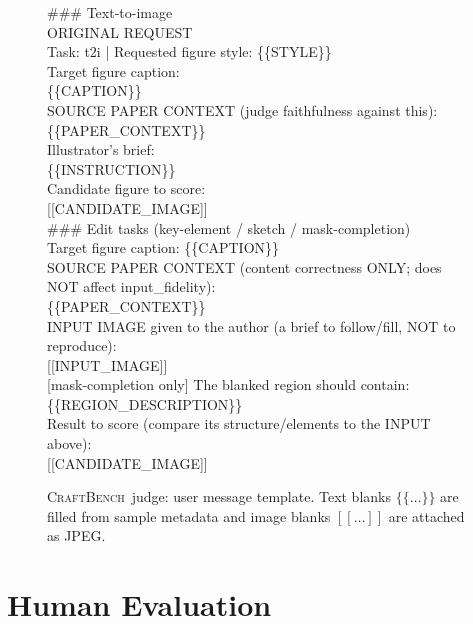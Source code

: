 \documentclass{article}
\newcommand{\CrafterBench}{\textsc{CraftBench}\xspace}
\begin{document}
\begin{figure}[t]
\centering
\begin{tcolorbox}[title={User message (text blanks filled from sample metadata; image blanks attached as JPEG)}, width=\textwidth, colback=gray!5, colframe=black, fonttitle=\bfseries]
\small
\#\#\# Text-to-image \\
ORIGINAL REQUEST \\
Task: t2i  |  Requested figure style: \{\{STYLE\}\} \\
Target figure caption: \\
\{\{CAPTION\}\} \\
SOURCE PAPER CONTEXT (judge faithfulness against this): \\
\{\{PAPER\_CONTEXT\}\} \\
Illustrator's brief: \\
\{\{INSTRUCTION\}\} \\
Candidate figure to score: \\
{}[[CANDIDATE\_IMAGE]] \\[5pt]
\#\#\# Edit tasks (key-element / sketch / mask-completion) \\
Target figure caption: \{\{CAPTION\}\} \\
SOURCE PAPER CONTEXT (content correctness ONLY; does NOT affect input\_fidelity): \\
\{\{PAPER\_CONTEXT\}\} \\
INPUT IMAGE given to the author (a brief to follow/fill, NOT to reproduce): \\
{}[[INPUT\_IMAGE]] \\
{}[mask-completion only] The blanked region should contain: \{\{REGION\_DESCRIPTION\}\} \\
Result to score (compare its structure/elements to the INPUT above): \\
{}[[CANDIDATE\_IMAGE]]
\end{tcolorbox}
\caption{\CrafterBench\ judge: user message template. Text blanks $\{\{\dots\}\}$ are filled from sample metadata and image blanks $[[\dots]]$ are attached as JPEG.}
\label{fig:prompt-judge-user}
\end{figure}

\section{Human Evaluation}
\label{app:human-eval}
\end{document}
